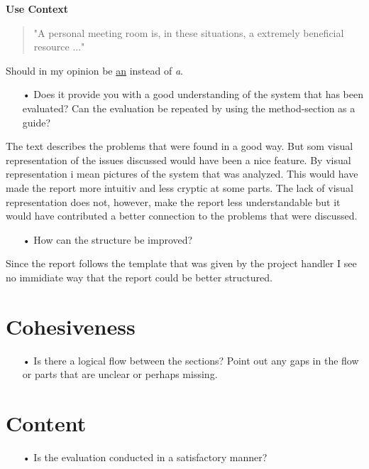 \documentclass[11pt,a4paper]{article}
\begin{document}
\textbf{Use Context}
\begin{quote}
"A personal meeting room is, in these situations, a extremely beneficial resource ..."
\end{quote}
Should in my opinion be \underline{an} instead of \textit{a}.

\begin{enumerate}
\item[•] Does it provide you with a good understanding of the system that has been evaluated? Can the evaluation be repeated by using the method-section as a guide? 
\end{enumerate}

The text describes the problems that were found in a good way. But som visual representation of the issues discussed would have been a nice feature. By visual representation i mean pictures of the system that was analyzed. This would have made the report more intuitiv and less cryptic at some parts. The lack of visual representation does not, however, make the report less understandable but it would have contributed a better connection to the problems that were discussed. 

\begin{enumerate}
\item[•] How can the structure be improved? 
\end{enumerate}

Since the report follows the template that was given by the project handler I see no immidiate way that the report could be better structured. 

\section{Cohesiveness}
\begin{enumerate}
\item[•] Is there a logical flow between the sections? Point out any gaps in the flow or parts that are unclear or perhaps missing.
\end{enumerate}



\section{Content}
\begin{enumerate}
\item[•] Is the evaluation conducted in a satisfactory manner? 
\end{enumerate}
\end{document}
